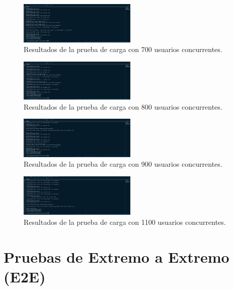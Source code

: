 \begin{figure}[H]
    \centering
    \includegraphics[width=0.5\textwidth]{figuras/pruebaCarga700U.png}
    \caption{Resultados de la prueba de carga con 700 usuarios concurrentes.}
    \label{fig:pruebaCarga700U}
\end{figure}

\begin{figure}[H]
    \centering
    \includegraphics[width=0.5\textwidth]{figuras/pruebaCarga800U.png}
    \caption{Resultados de la prueba de carga con 800 usuarios concurrentes.}
    \label{fig:pruebaCarga800U}
\end{figure}

\begin{figure}[H]
    \centering
    \includegraphics[width=0.5\textwidth]{figuras/pruebaCarga900U.png}
    \caption{Resultados de la prueba de carga con 900 usuarios concurrentes.}
    \label{fig:pruebaCarga900U}
\end{figure}

\begin{figure}[H]
    \centering
    \includegraphics[width=0.5\textwidth]{figuras/pruebaCarga1100U.png}
    \caption{Resultados de la prueba de carga con 1100 usuarios concurrentes.}
    \label{fig:pruebaCarga1100U}
\end{figure}

\section{Pruebas de Extremo a Extremo (E2E)}


